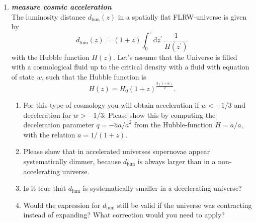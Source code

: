 \documentclass[a4paper,12pt]{article}
\newcommand{\question}[1]{\textbf{\textit{#1}}}
\begin{document}
\begin{enumerate}
\item \question{measure cosmic acceleration}\\
The luminosity distance $d_\mathrm{lum}(z)$ in a spatially flat FLRW-universe is given by
\begin{equation}
d_\mathrm{lum}(z) = (1+z)\int_0^z\mathrm{d}z^\prime\:\frac{1}{H(z^\prime)}
\end{equation}
with the Hubble function $H(z)$. Let's assume that the Universe is filled with a cosmological fluid up to the critical density with a fluid with equation of state $w$, such that the Hubble function is
\begin{equation}
H(z) = H_0 (1+z)^\frac{3(1+w)}{2}.
\end{equation}
\begin{enumerate}
\item{For this type of cosmology you will obtain acceleration if $w<-1/3$ and deceleration for $w>-1/3$: Please show this by computing the deceleration parameter $q=-\ddot{a}a/\dot{a}^2$ from the Hubble-function $H=\dot{a}/a$, with the relation $a=1/(1+z)$.}
\item{Please show that in accelerated universes supernovae appear systematically dimmer, because $d_\mathrm{lum}$ is always larger than in a non-accelerating universe.}
\item{Is it true that $d_\mathrm{lum}$ is systematically smaller in a decelerating universe?}
\item{Would the expression for $d_\mathrm{lum}$ still be valid if the universe was contracting instead of expanding? What correction would you need to apply?}
\end{enumerate}

\end{enumerate}
\end{document}
